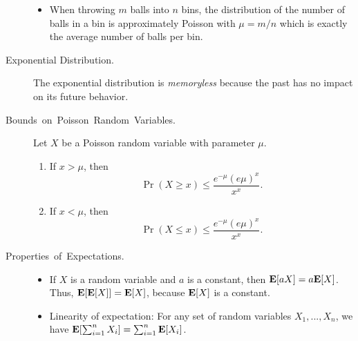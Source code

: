 \documentclass[11pt]{article}
\theoremstyle{mytheoremstyle}
\begin{document}
\begin{description}
\begin{itemize}
		\item When throwing $m$ balls into $n$ bins, the distribution of the number
		of balls in a bin is approximately Poisson with $\mu=m/n$ which is
		exactly the average number of balls per bin.
	\end{itemize}
	
	\item [Exponential Distribution.]
	The exponential distribution is \emph{memoryless} because the past has no impact on its future behavior.
	
	\item [{Bounds~on~Poisson~Random~Variables.}] Let $X$ be a Poisson random variable with parameter $\mu$.
	
	\begin{enumerate}
		\item If $x>\mu$, then 
		\[
		\Pr(X\geq x)\leq\frac{e^{-\mu}(e\mu)^{x}}{x^{x}}.
		\]
		\item If $x<\mu$, then
		\[
		\Pr(X\leq x)\leq\frac{e^{-\mu}(e\mu)^{x}}{x^{x}}.
		\]
	\end{enumerate}
	\item [{Properties~of~Expectations.}] 
	
	\begin{itemize}
		\item If $X$ is a random variable and $a$ is a constant, then $\mathrm{\mathbf{E}}[aX]=a\mathrm{\mathbf{E}}[X]$.
		Thus, $\mathrm{\mathrm{\mathbf{E}}}[\mathrm{\mathbf{E}}[X]]=\mathrm{\mathbf{E}}[X]$, because $\mathrm{\mathbf{E}}[X]$ is a constant.
		\item Linearity of expectation: For any set of random variables $X_{1},...,X_{n}$,
		we have $\mathrm{\mathbf{E}}[\sum_{i=1}^{n}X_{i}]=\sum_{i=1}^{n}\mathrm{\mathbf{E}}[X_{i}]$.
	\end{itemize}
\end{description}
\end{document}
